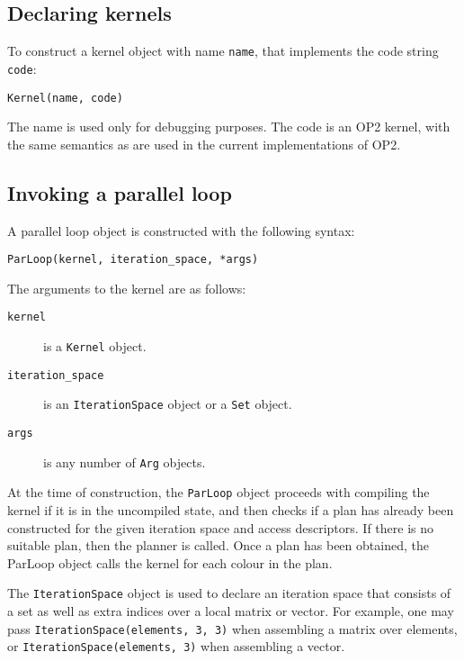 \documentclass[a4paper]{article}
\begin{document}
\subsection{Declaring kernels}

To construct a kernel object with name \verb|name|, that implements the code string \verb|code|:

\begin{verbatim}
Kernel(name, code)
\end{verbatim}

The name is used only for debugging purposes. The code is an OP2 kernel, with the same semantics as are used in the current implementations of OP2.

\subsection{Invoking a parallel loop}

A parallel loop object is constructed with the following syntax:

\begin{verbatim}
ParLoop(kernel, iteration_space, *args)
\end{verbatim}

The arguments to the kernel are as follows:

\begin{description}
  \item[\texttt{kernel}] is a \verb|Kernel| object.
  \item[\texttt{iteration\_space}] is an \verb|IterationSpace| object or a \verb|Set| object.
  \item[\texttt{args}] is any number of \verb|Arg| objects.
\end{description}

At the time of construction, the \verb|ParLoop| object proceeds with compiling the kernel if it is in the uncompiled state, and then checks if a plan has already been constructed for the given iteration space and access descriptors. If there is no suitable plan, then the planner is called. Once a plan has been obtained, the ParLoop object calls the kernel for each colour in the plan. 

The \verb|IterationSpace| object is used to declare an iteration space that consists of a set as well as extra indices over a local matrix or vector. For example, one may pass \verb|IterationSpace(elements, 3, 3)| when assembling a matrix over elements, or \verb|IterationSpace(elements, 3)| when assembling a vector.
\end{document}
